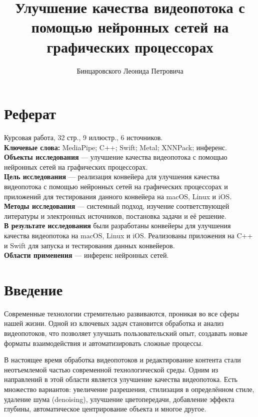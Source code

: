 \documentclass[a4paper,14pt]{extreport}
\title{Улучшение качества видеопотока с помощью нейронных сетей на графических процессорах}
\author{Бинцаровского Леонида Петровича}
\begin{document}
    \maketitle\newpage
    
    \chapter*{Реферат}
    Курсовая работа, 32 стр., 9 иллюстр., 6 источников.\\
    \textbf{Ключевые слова:} MediaPipe; C++; Swift; Metal; XNNPack; инференс.\\
    \textbf{Объекты исследования} — улучшение качества видеопотока с помощью нейронных сетей на графических процессорах.\\
    \textbf{Цель исследования} — реализация конвейера для улучшения качества видеопотока с помощью нейронных сетей на графических процессорах и приложений для тестирования данного конвейера на macOS, Linux и iOS.\\
    \textbf{Методы исследования} — системный подход, изучение соответствующей литературы и электронных источников, постановка задачи и её решение.\\
    \textbf{В результате исследования} были разработаны конвейеры для улучшения качества видеопотока на macOS, Linux и iOS. Реализованы приложения на C++ и Swift для запуска и тестирования данных конвейеров.\\
    \textbf{Области применения} — инференс нейронных сетей.
    
    \tableofcontents\newpage
    \chapter*{Введение}
    Современные технологии стремительно развиваются, проникая во все сферы нашей жизни. Одной из ключевых задач становится обработка и анализ видеопотоков, что позволяет улучшать пользовательский опыт, создавать новые форматы взаимодействия и автоматизировать сложные процессы.
    
    В настоящее время обработка видеопотоков и редактирование контента стали неотъемлемой частью современной технологической среды. Одним из направлений в этой области является улучшение качества видеопотока. Есть множество вариантов: увеличение разрешения, стилизация в определённом стиле, удаление шума (denoising), улучшение цветопередачи, добавление эффекта глубины, автоматическое центрирование объекта и многое другое.
\end{document}
